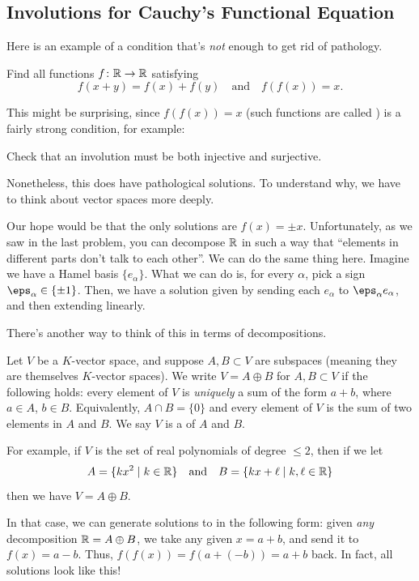 \documentclass[11pt]{scrartcl}
\begin{document}
\subsection{Involutions for Cauchy's Functional Equation}
Here is an example of a condition that's \emph{not} enough to get rid of pathology.
\begin{example}
  \label{ex:invol}
  Find all functions $f \colon \mathbb R \to \mathbb R$  satisfying
  \[ f(x+y) = f(x)+f(y) \quad\text{and}\quad f(f(x)) = x. \]
\end{example}
This might be surprising, since $f(f(x)) = x$
(such functions are called )
is a fairly strong condition, for example:
\begin{exercise}
  Check that an involution must be both injective and surjective.
\end{exercise}
Nonetheless, this does have pathological solutions.
To understand why, we have to think about vector spaces more deeply.

Our hope would be that the only solutions are $f(x) = \pm x$.
Unfortunately, as we saw in the last problem, you can decompose $\mathbb R$ in such a way that
``elements in different parts don't talk to each other''.
We can do the same thing here.
Imagine we have a Hamel basis $\{e_\alpha\}$.
What we can do is, for every $\alpha$, pick a sign $\eps_\alpha \in \{\pm1\}$.
Then, we have a solution given by sending each $e_\alpha$ to $\eps_\alpha e_\alpha$,
and then extending linearly.

There's another way to think of this in terms of decompositions.
\begin{definition}
  Let $V$ be a $K$-vector space, and suppose $A, B \subset V$ are subspaces
  (meaning they are themselves $K$-vector spaces).
  We write $V = A \oplus B$ for $A, B \subset V$ if the following holds:
  every element of $V$ is \emph{uniquely} a sum of the form $a + b$,
  where $a \in A$, $b \in B$.
  Equivalently, $A \cap B = \{0\}$ and every element of $V$ is the sum
  of two elements in $A$ and $B$.
  We say $V$ is a  of $A$ and $B$.
\end{definition}
For example, if $V$ is the set of real polynomials of degree $\le 2$,
then if we let
\[ A = \{ kx^2 \mid k \in \mathbb R \} \quad\text{and}\quad B = \{ kx  + \ell \mid k,\ell \in \mathbb R \} \]
then we have $V = A \oplus B$.

In that case, we can generate solutions to 
in the following form: given \emph{any} decomposition $\mathbb R = A \oplus B$,
we take any given $x = a+b$, and send it to $f(x) = a-b$.
Thus, $f(f(x)) = f(a + (-b)) = a + b$ back.
In fact, all solutions look like this!
\end{document}
